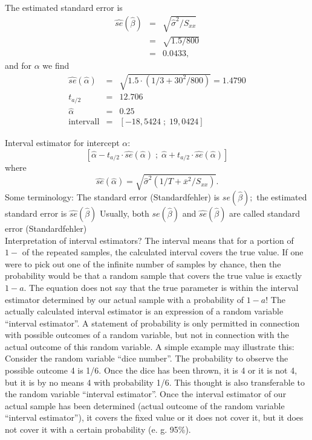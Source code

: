 \documentclass{article}
\begin{document}
\begin{itemize}
The estimated standard error is%
\begin{eqnarray*}
	\widehat{se}(\hat{\beta}) &=&\sqrt{\hat{\sigma}^{2}/S_{xx}} \\
	&=&\sqrt{1.5/800} \\
	&=&0.0433,
\end{eqnarray*}%
and for $\alpha $ we find%
\begin{eqnarray*}
	\widehat{se}(\hat{\alpha}) &=&\sqrt{1.5\cdot \left( 1/3+30^{2}/800\right) }%
	=1.4790 \\
	t_{a/2} &=&12.706 \\
	\hat{\alpha} &=&0.25 \\
	\text{intervall} &=&\left[ -18,5424\;;\;19,0424\right]
\end{eqnarray*}

\end{itemize}

Interval estimator for intercept $\alpha$:
\[ \left[ \hat{\alpha}-t_{a/2}\cdot \widehat{se}(\hat{\alpha})\;;\;\hat{\alpha}
+t_{a/2}\cdot \widehat{se}(\hat{\alpha})\right] \]
where
\[ \widehat{se}(\hat{\alpha})=\sqrt{\widehat{\sigma }^{2}(1/T+\overline{x}^{2}/S_{xx})}. \]
Some terminology: The standard error (Standardfehler) is $se(\hat{\beta});$ \newline
the estimated standard error is $\widehat{se}(\hat{\beta})$\newline
Usually, both $se(\hat{\beta})$ and $\widehat{se}(\hat{\beta})$ are called standard error (Standardfehler)\\

Interpretation of interval estimators?
The interval means that for a portion of $1-$ of the repeated samples, the calculated interval covers the true value. If one were to pick out one of the infinite number of samples by chance, then the probability would be that a random sample that covers the true value is exactly $1-a$. The equation does not say that the true parameter is within the interval estimator determined by our actual sample with a probability of $1-a$! The actually calculated interval estimator is an expression of a random variable \enquote{interval estimator}. A statement of probability is only permitted in connection with possible outcomes of a random variable, but not in connection with the actual outcome of this random variable. A simple example may illustrate this: Consider the random variable \enquote{dice number}. The probability to observe the possible outcome 4 is 1/6. Once the dice has been thrown, it is 4 or it is not 4, but it is by no means 4 with probability 1/6. This thought is also transferable to the random variable \enquote{interval estimator}. Once the interval estimator of our actual sample has been determined (actual outcome of the random variable \enquote{interval estimator}), it covers the fixed value or it does not cover it, but it does not cover it with a certain probability (e. g. 95\%).
\end{document}
